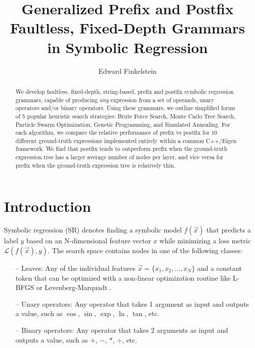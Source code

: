 \documentclass[runningheads]{llncs}
\begin{document}
%
\title{Generalized Prefix and Postfix Faultless, Fixed-Depth Grammars in Symbolic Regression}%
%
%
\author{Edward Finkelstein}%
%
%
%
\maketitle              %
%
\begin{abstract}
We develop faultless, fixed-depth, string-based, prefix and postfix symbolic regression grammars, capable of producing \emph{any} expression from a set of operands, unary operators and/or binary operators. Using these grammars, we outline simplified forms of 5 popular heuristic search strategies: Brute Force Search, Monte Carlo Tree Search, Particle Swarm Optimization, Genetic Programming, and Simulated Annealing. For each algorithm, we compare the relative performance of prefix vs postfix for 10 different ground-truth expressions implemented entirely within a common C++/Eigen framework. We find that postfix tends to outperform prefix when the ground-truth expression tree has a larger average number of nodes per layer, and vice versa for prefix when the ground-truth expression tree is relatively thin.

\end{abstract}

\section{Introduction}
Symbolic regression (SR) denotes finding a symbolic model $f\left(\vec{x}\right)$ that predicts a label $y$ based on an N-dimensional feature vector $x$ while minimizing a loss metric $\mathcal{L}\left(f\left(\vec{x}\right),y\right)$. The search space contains nodes in one of the following classes:
\begin{itemize}
\item[--] Leaves: Any of the individual features $\vec{x} = \{x_1, x_2, \ldots,x_{N}\}$ and a constant token that can be optimized with a non-linear optimization routine like L-BFGS \cite{doi:10.1137/0916069} or Levenberg-Marquadt \cite{83b09f23-b20e-3617-8f72-24765b713f7b} \cite{doi:10.1137/0111030}.
\item[--] Unary operators: Any operator that takes 1 argument as input and outputs a value, such as $\cos$, $\sin$, $\exp$, $\ln$, $\tan$, etc.
\item[--] Binary operators: Any operator that takes 2 arguments as input and outputs a value, such as $+$, $-$, $*$, $\div$, etc.
\end{itemize}
\end{document}
